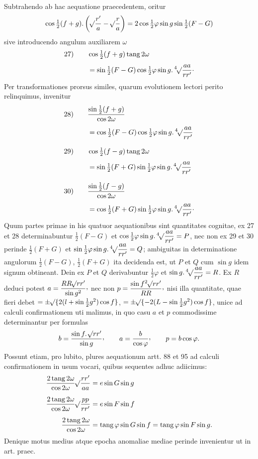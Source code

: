 Subtrahendo ab hac aequatione praecedentem, oritur
\[
\cos\tfrac12(f+g)\mathpunct{.}\left(\BareRoot{\dfrac{r'}{a}}-\BareRoot{\dfrac{r}{a}}\right)=2\cos\tfrac12\varphi\sin g\sin\tfrac12(F-G)
\]
sive introducendo angulum auxiliarem $\omega$
\[
\begin{aligned}
\mathrm{27)}\qquad &\cos\tfrac12(f+g)\operatorname{tang}2\omega\\[4pt]
&=\sin\tfrac12(F-G)\cos\tfrac12\varphi\sin g\mathpunct{.}\BareRoot[4]{\dfrac{aa}{rr'}}\mathpunct{\cdot}
\end{aligned}
\]
Per transformationes prorsus similes, quarum evolutionem lectori perito relinquimus, invenitur
\[
\begin{aligned}
\mathrm{28)}\qquad &\dfrac{\sin\frac12(f+g)}{\cos 2\omega}\\[4pt]
&=\cos\tfrac12(F-G)\cos\tfrac12\varphi\sin g\mathpunct{.}\BareRoot[4]{\dfrac{aa}{rr'}}\\[8pt]
\mathrm{29)}\qquad &\cos\tfrac12(f-g)\operatorname{tang}2\omega\\[4pt]
&=\sin\tfrac12(F+G)\sin\tfrac12\varphi\sin g\mathpunct{.}\BareRoot[4]{\dfrac{aa}{rr'}}\\[8pt]
\mathrm{30)}\qquad &\dfrac{\sin\frac12(f-g)}{\cos 2\omega}\\[4pt]
&=\cos\tfrac12(F+G)\sin\tfrac12\varphi\sin g\mathpunct{.}\BareRoot[4]{\dfrac{aa}{rr'}}\mathpunct{\cdot}
\end{aligned}
\]
Quum partes primae in his quatuor aequationibus sint quantitates cognitae, ex 27 et 28 determinabuntur $\frac12(F-G)$ et $\cos\frac12\varphi\sin g\mathpunct{.}\BareRoot[4]{\dfrac{aa}{rr'}}=P$, nec non ex 29 et 30 perinde $\frac12(F+G)$ et $\sin\frac12\varphi\sin g\mathpunct{.}\BareRoot[4]{\dfrac{aa}{rr'}}=Q$; ambiguitas in determinatione angulorum $\frac12(F-G)$, $\frac12(F+G)$ ita decidenda est, ut $P$ et $Q$ cum $\sin g$ idem signum obtineant. Dein ex $P$ et $Q$ derivabuntur $\frac12\varphi$ et $\sin g\mathpunct{.}\BareRoot[4]{\dfrac{aa}{rr'}}=R$. Ex $R$ deduci potest $a=\dfrac{RR\BareRoot{rr'}}{\sin g^2}\mathpunct{\raisebox{.45ex}{,}}$ nec non $p=\dfrac{\sin f^2\BareRoot{rr'}}{RR}\mathpunct{\raisebox{.45ex}{,}}$ nisi illa quantitate, quae fieri debet $=\pm\BareRoot{\{2(l+\sin\frac12 g^2)\cos f\}}$, $=\pm\BareRoot{\{-2(L-\sin\frac12 g^2)\cos f\}}$, unice ad calculi confirmationem uti malimus, in quo casu $a$ et $p$ commodissime determinantur per formulas
\[
b=\dfrac{\sin f\mathpunct{.}\BareRoot{rr'}}{\sin g}\mathpunct{\raisebox{.45ex}{,}}\qquad a=\dfrac{b}{\cos\varphi}\mathpunct{\raisebox{.45ex}{,}}\qquad p=b\cos\varphi.
\]
Possunt etiam, pro lubito, plures aequationum artt. 88 et 95 ad calculi confirmationem in usum vocari, quibus sequentes adhuc adiicimus:
\[
\begin{aligned}
\dfrac{2\operatorname{tang}2\omega}{\cos 2\omega}\BareRoot{\dfrac{rr'}{aa}}&=e\sin G\sin g\\[6pt]
\dfrac{2\operatorname{tang}2\omega}{\cos 2\omega}\BareRoot{\dfrac{pp}{rr'}}&=e\sin F\sin f\\[6pt]
\dfrac{2\operatorname{tang}2\omega}{\cos 2\omega}&=\operatorname{tang}\varphi\sin G\sin f=\operatorname{tang}\varphi\sin F\sin g.
\end{aligned}
\]
Denique motus medius atque epocha anomaliae mediae perinde invenientur ut in art. praec.
